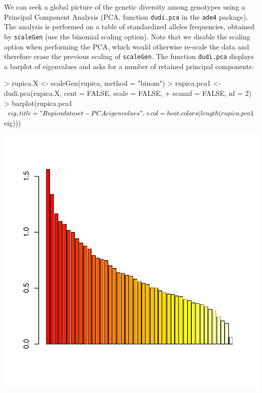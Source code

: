 \documentclass{article}
\begin{document}
We can seek a global picture of the genetic diversity among genotypes
using a Principal Component Analysis (PCA, function \texttt{dudi.pca} in the \texttt{ade4}
package).
The analysis is performed on a table of standardized alleles
frequencies, obtained by \texttt{scaleGen} (use the binomial scaling option).
Note that we disable the scaling option when performing the PCA, which would otherwise re-scale the
data and therefore erase the previous scaling of \texttt{scaleGen}.
The function \texttt{dudi.pca} displays a barplot of
eigenvalues and asks for a number of retained principal components:
\begin{Schunk}
\begin{Sinput}
> rupica.X <- scaleGen(rupica, method = "binom")
> rupica.pca1 <- dudi.pca(rupica.X, cent = FALSE, scale = FALSE, 
+     scannf = FALSE, nf = 2)
> barplot(rupica.pca1$eig, title = "Rupica dataset - PCA eigenvalues", 
+     col = heat.colors(length(rupica.pca1$eig)))
\end{Sinput}
\end{Schunk}
\includegraphics{figs/spca-032}
\end{document}
